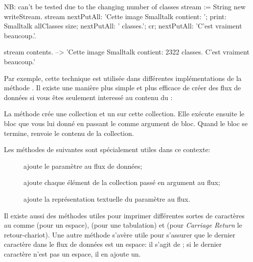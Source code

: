 \documentclass[a4paper,10pt,twoside]{book}
\begin{document}
\begin{code}{NB: can't be tested due to the changing number of classes}
stream := String new writeStream.
stream
  nextPutAll: 'Cette image Smalltalk contient: ';
  print: Smalltalk allClasses size;
  nextPutAll: ' classes.';
  cr;
  nextPutAll: 'C'est vraiment beaucoup.'.

stream contents. --> 'Cette image Smalltalk contient: 2322 classes.
C'est vraiment beaucoup.'
\end{code}

Par exemple, cette technique est utilis\'ee dans diff\'erentes 
impl\'ementations de la m\'ethode . Il existe une mani\`ere
plus simple et plus efficace de cr\'eer des flux de donn\'ees si vous \^etes
seulement interess\'e au contenu du \stream:


La m\'ethode  \label{sec:streamContents} cr\'ee une collection et un \stream sur cette collection.
Elle ex\'ecute ensuite le bloc que vous lui donn\'e en passant le \stream comme argument de bloc. Quand le bloc se termine, 
renvoie le contenu de la collection.

Les m\'ethodes de  suivantes sont sp\'ecialement utiles dans ce contexte:

\begin{description}
\item[] ajoute le param\`etre au flux de donn\'ees;
\item[] ajoute chaque \'el\'ement de la collection pass\'e en argument au flux;
\item[] ajoute la repr\'esentation textuelle du param\`etre au flux.
\end{description}

Il existe aussi des m\'ethodes utiles pour imprimer diff\'erentes sortes
de caract\`eres au \stream comme  (pour un espace), 
    (pour une tabulation) et
 (pour \emph{Carriage Return} \cad le retour-chariot).
Une autre m\'ethode s'av\`ere utile pour s'assurer que le dernier caract\`ere
dans le flux de donn\'ees est un espace: il s'agit de ; si le dernier caract\`ere n'est pas un espace, il en ajoute un.
\end{document}
